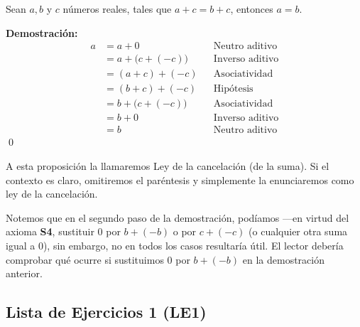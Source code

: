 \documentclass[11pt]{article}
\begin{document}
\pagebreak

Sean $a,b$ y $c$ números reales, tales que $a+c=b+c$, entonces $a=b$.

\textbf{Demostración:} \begin{align*}
    a &= a+0 && \text{Neutro aditivo}\\
    &= a+ \bigl(c+(-c)\bigr) && \text{Inverso aditivo}\\
    &= (a+c) + (-c) && \text{Asociatividad}\\
    &= (b+c) + (-c) && \text{Hipótesis}\\
    &= b + \bigl(c+(-c)\bigr) && \text{Asociatividad}\\
    &= b + 0 && \text{Inverso aditivo}\\
    &= b && \text{Neutro aditivo}
\end{align*}\qed

A esta proposición la llamaremos Ley de la cancelación (de la suma). Si el contexto es claro, omitiremos el paréntesis y simplemente la enunciaremos como ley de la cancelación.

Notemos que en el segundo paso de la demostración, podíamos —en virtud del axioma \textbf{S4}, sustituir $0$ por $b+(-b)$ o por $c+(-c)$ (o cualquier otra suma igual a $0$), sin embargo, no en todos los casos resultaría útil. El lector debería comprobar qué ocurre si sustituimos $0$ por $b+(-b)$ en la demostración anterior.

\subsection*{Lista de Ejercicios 1 (LE1)}
\end{document}
